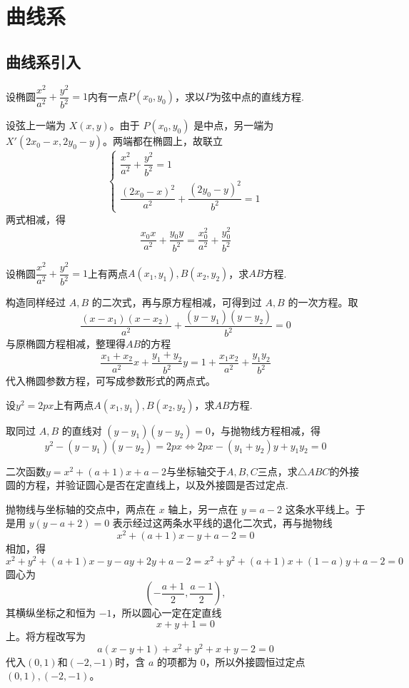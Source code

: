 \chapter{曲线系}
\section{曲线系引入}
\begin{example}[（椭圆上的中点弦直线）]
设椭圆$\dfrac{x^2}{a^2}+\dfrac{y^2}{b^2}=1$内有一点$P(x_0,y_0)$，求以$P$为弦中点的直线方程.
\end{example}
\begin{solution}
    设弦上一端为 $X(x,y)$。由于 $P(x_0,y_0)$ 是中点，另一端为 $X'(2x_0-x,2y_0-y)$。两端都在椭圆上，故联立
    \[\begin{cases}\dfrac{x^2}{a^2}+\dfrac{y^2}{b^2}=1\\\dfrac{(2x_0-x)^2}{a^2}+\dfrac{(2y_0-y)^2}{b^2}=1\end{cases}\]
    两式相减，得\[\dfrac{x_0x}{a^2}+\dfrac{y_0y}{b^2}=\dfrac{x_0^2}{a^2}+\dfrac{y_0^2}{b^2}\]
\end{solution}
\begin{example}[（椭圆上的直线两点式）]
设椭圆$\dfrac{x^2}{a^2}+\dfrac{y^2}{b^2}=1$上有两点$A(x_1,y_1),B(x_2,y_2)$，求$AB$方程.
\end{example}
\begin{solution}
    构造同样经过 $A,B$ 的二次式，再与原方程相减，可得到过 $A,B$ 的一次方程。取
    \[\dfrac{(x-x_1)(x-x_2)}{a^2}+\dfrac{(y-y_1)(y-y_2)}{b^2}=0\]
    与原椭圆方程相减，整理得$AB$的方程
    \[\dfrac{x_1+x_2}{a^2}x+\dfrac{y_1+y_2}{b^2}y=1+\dfrac{x_1x_2}{a^2}+\dfrac{y_1y_2}{b^2}\]
    代入椭圆参数方程，可写成参数形式的两点式。
\end{solution}
\begin{example}[（抛物线上的直线两点式）]
设$y^2=2px$上有两点$A(x_1,y_1),B(x_2,y_2)$，求$AB$方程.
\end{example}
\begin{solution}
    取同过 $A,B$ 的直线对 $(y-y_1)(y-y_2)=0$，与抛物线方程相减，得
    \[y^2-(y-y_1)(y-y_2)=2px\Leftrightarrow 2px-(y_1+y_2)y+y_1y_2=0\]
\end{solution}
\begin{example}[（利用梯形得到四点共圆）]
    二次函数$y=x^2+(a+1)x+a-2$与坐标轴交于$A,B,C$三点，求$\triangle ABC$的外接圆的方程，并验证圆心是否在定直线上，以及外接圆是否过定点.
\end{example}
\begin{solution}
    抛物线与坐标轴的交点中，两点在 $x$ 轴上，另一点在 $y=a-2$ 这条水平线上。于是用 $y(y-a+2)=0$ 表示经过这两条水平线的退化二次式，再与抛物线
    \[
    x^2+(a+1)x-y+a-2=0
    \]
    相加，得
    \[x^2+y^2+(a+1)x-y-ay+2y+a-2=x^2+y^2+(a+1)x+(1-a)y+a-2=0\]
    圆心为
    \[
    \left(-\frac{a+1}{2},\frac{a-1}{2}\right),
    \]
    其横纵坐标之和恒为 $-1$，所以圆心一定在定直线
    \[
    x+y+1=0
    \]
    上。将方程改写为
    \[a(x-y+1)+x^2+y^2+x+y-2=0\]
    代入$(0,1)$和$(-2,-1)$时，含 $a$ 的项都为 $0$，所以外接圆恒过定点$(0,1),(-2,-1)$。
\end{solution}
